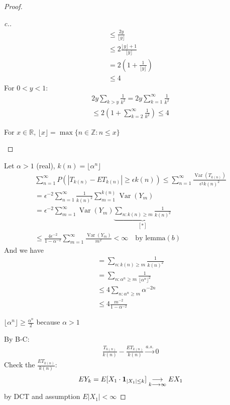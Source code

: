 \documentclass[11pt]{article}
\begin{document}
\begin{proof}
\begin{proof}[c.]
\begin{align}
            \le \frac{2y}{\lfloor y \rfloor} \\
            \le 2 \frac{\lfloor y \rfloor + 1}{\lfloor y \rfloor} \\
            = 2(1+\frac{1}{\lfloor y \rfloor}) \\
            \le 4 
        \end{align}
        For $0 < y < 1$:
        \begin{align}
            2y\sum_{k > y}\frac{1}{k^{2}} = 2y \sum_{k=1}^{\infty}\frac{1}{k^{2}} \\
            \le 2(1+ \sum_{k=2}^{\infty}\frac{1}{k^{2}}) \le 4
        \end{align}
        \begin{remark}
            For $x \in \mathbb{R},\, \lfloor  x  \rfloor = \max\{ n \in \mathbb{Z}: n \le x \}$
        \end{remark}
    \end{proof}
    Let $\alpha > 1$ (real), $k(n) = \lfloor \alpha ^{n} \rfloor$
    \begin{align*}
        \sum_{n=1}^{\infty}P(|T_{k(n)} - ET_{k(n)}| \ge \epsilon k(n)) \le 
        \sum_{n=1}^{\infty} \frac{\operatorname{Var}(T_{k(n)})}{\epsilon ^{2}k(n)^{2}}\\
        = \epsilon^{-2}\sum_{n=1}^{\infty} \frac{1}{k(n)^{2}}\sum_{m=1}^{k(n)}
        \operatorname{Var}(Y_m) \\
        = \epsilon ^{-2}\sum_{m=1}^{\infty}\operatorname{Var}(Y_m) 
        \underbrace{\sum_{n: k(n) \ge m}\frac{1}{k(n)^{2}}}_{[*]} \\
        \le \frac{4 \epsilon ^{-2}}{1-\alpha ^{-2}}\sum_{m=1}^{\infty}
        \frac{\operatorname{Var}(Y_m)}{m^{2}} < \infty \quad \text{by lemma} (b)
    \end{align*}
    And we have 
    \begin{align*}
        [*] = \sum_{n: k(n)\ge m}\frac{1}{k(n)^{2}} \\
        = \sum_{n: \alpha ^{n} \ge m} \frac{1}{\lfloor \alpha ^{n} \rfloor ^{2}} \\
        \le 4 \sum_{n: \alpha ^{n} \ge m}\alpha ^{-2n} \\
        \le 4 \frac{m^{-2}}{1-\alpha ^{-2}}
    \end{align*}
    \begin{claim}
        $\lfloor \alpha ^{n} \rfloor \ge \frac{\alpha ^{n}}{2}$ because $\alpha > 1$
    \end{claim}
    By B-C: 
    \begin{align*}
        \frac{T_{k(n)}}{k(n)} - \frac{ET_{k(n)}}{k(n)} \overset{a.s.}{\longrightarrow} 0
    \end{align*}
    Check the $\frac{ET_{k(n)}}{k(n)}$:
    \begin{align*}
        EY_{k} = E[X_1 \cdot \bm{1}_{|X_1| \le k}] \underset{k \longrightarrow \infty}{\longrightarrow} EX_1
    \end{align*}
    by DCT and assumption $E|X_1| < \infty$


\end{proof}
\end{document}
